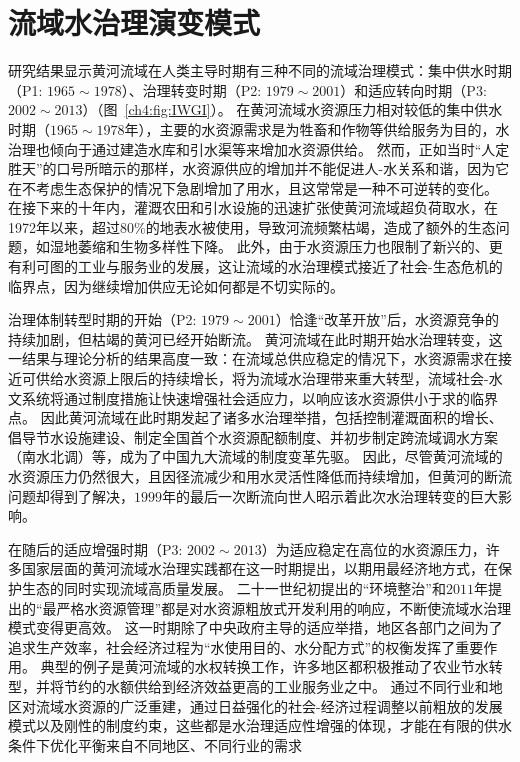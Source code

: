 \section{流域水治理演变模式}

研究结果显示黄河流域在人类主导时期有三种不同的流域治理模式：集中供水时期（P1: $1965 \sim 1978$）、治理转变时期（P2: $1979 \sim 2001$）和适应转向时期（P3: $2002 \sim 2013$）（图~\ref{ch4:fig:IWGI}）。
在黄河流域水资源压力相对较低的集中供水时期（$1965 \sim 1978$年），主要的水资源需求是为牲畜和作物等供给服务为目的，水治理也倾向于通过建造水库和引水渠等来增加水资源供给。
然而，正如当时“人定胜天”的口号所暗示的那样，水资源供应的增加并不能促进人-水关系和谐，因为它在不考虑生态保护的情况下急剧增加了用水，且这常常是一种不可逆转的变化\cite{zhou2020}。
在接下来的十年内，灌溉农田和引水设施的迅速扩张使黄河流域超负荷取水，在1972年以来，超过$80\%$的地表水被使用，导致河流频繁枯竭，造成了额外的生态问题，如湿地萎缩和生物多样性下降\cite{wang2019c}。
此外，由于水资源压力也限制了新兴的、更有利可图的工业与服务业的发展，这让流域的水治理模式接近了社会-生态危机的临界点，因为继续增加供应无论如何都是不切实际的\cite{loch2020, wohlfart2016a}。

治理体制转型时期的开始（P2: $1979 \sim 2001$）恰逢“改革开放”后，水资源竞争的持续加剧，但枯竭的黄河已经开始断流。
黄河流域在此时期开始水治理转变，这一结果与理论分析的结果高度一致：在流域总供应稳定的情况下，水资源需求在接近可供给水资源上限后的持续增长，将为流域水治理带来重大转型，流域社会-水文系统将通过制度措施让快速增强社会适应力，以响应该水资源供小于求的临界点\cite{loch2020}。
因此黄河流域在此时期发起了诸多水治理举措，包括控制灌溉面积的增长、倡导节水设施建设、制定全国首个水资源配额制度、并初步制定跨流域调水方案（南水北调）等\cite{wang2019b,long2020,nickum2021}，成为了中国九大流域的制度变革先驱。
因此，尽管黄河流域的水资源压力仍然很大，且因径流减少和用水灵活性降低而持续增加，但黄河的断流问题却得到了解决，$1999$年的最后一次断流向世人昭示着此次水治理转变的巨大影响\cite{wang2019b}。

在随后的适应增强时期（P3: $2002 \sim 2013$）为适应稳定在高位的水资源压力，许多国家层面的黄河流域水治理实践都在这一时期提出，以期用最经济地方式，在保护生态的同时实现流域高质量发展。
二十一世纪初提出的“环境整治”和$2011$年提出的“最严格水资源管理”都是对水资源粗放式开发利用的响应，不断使流域水治理模式变得更高效。
这一时期除了中央政府主导的适应举措，地区各部门之间为了追求生产效率，社会经济过程为“水使用目的、水分配方式”的权衡发挥了重要作用。
典型的例子是黄河流域的水权转换工作，许多地区都积极推动了农业节水转型，并将节约的水额供给到经济效益更高的工业服务业之中。
通过不同行业和地区对流域水资源的广泛重建，通过日益强化的社会-经济过程调整以前粗放的发展模式以及刚性的制度约束，这些都是水治理适应性增强的体现，才能在有限的供水条件下优化平衡来自不同地区、不同行业的需求\cite{dalin2015,song2022}

